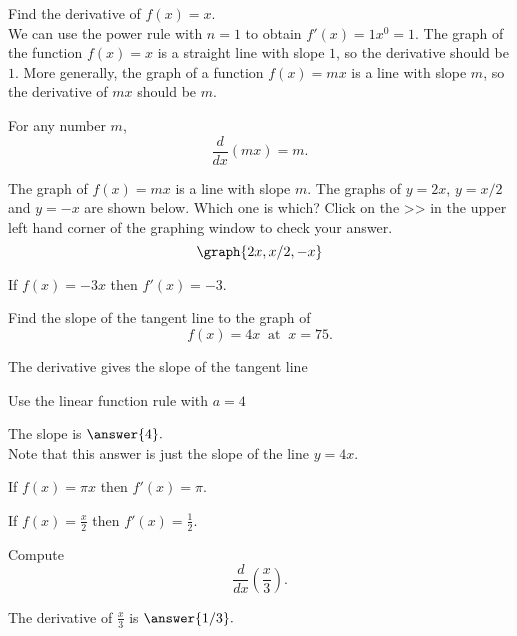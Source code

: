\documentclass{ximera}
\begin{document}
\begin{example} %
Find the derivative of $f(x) = x$.\\
We can use the power rule with $n=1$ to obtain $f'(x) = 1x^0 = 1$. 
The graph of the function $f(x) = x$ is a straight line with slope $1$,
so the derivative should be $1$.  More generally, the graph of a function $f(x) = mx$
is a line with slope $m$, so the derivative of $mx$ should be $m$.

\end{example}

\begin{proposition}
For any number $m$,
\[
\frac{d}{dx} (mx) = m.
\]
\end{proposition}

The graph of $f(x) = mx$ is a line with slope $m$.
The graphs of $y = 2x$, $y = x/2$ and $y = -x$ are shown below.
Which one is which? Click on the >> in the upper left hand corner of the graphing window to check your answer.
\[
\graph{2x, x/2, -x}
\]


\begin{example} %
If $f(x) = -3x$ then $f'(x) = -3$.
\end{example}

\begin{problem}
Find the slope of the tangent line to the graph of 
\[
f(x) = 4x  \;\; \text{at} \;\; x = 75.
\]



\begin{hint}
The derivative gives the slope of the tangent line
\end{hint}
\begin{hint}
Use the linear function rule with $a = 4$
\end{hint}
The slope is  $\answer{4}.$\\
Note that this answer is just the slope of the line $y = 4x$.
\end{problem}


\begin{example} %
If $f(x) = \pi x$ then $f'(x) = \pi$.
\end{example}


\begin{example} %
If $f(x) = \frac{x}{2}$ then $f'(x) = \frac 12$.
\end{example}

\begin{problem}
Compute
\[
\frac{d}{dx} \left(\frac{x}{3}\right).
\]

The derivative of $\frac{x}{3}$ is $\answer{1/3}.$
\end{problem}
\end{document}
